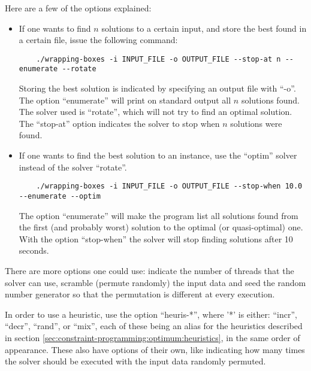 Here are a few of the options explained:
\begin{itemize}
	\item If one wants to find $n$ solutions to a certain input, and store the
	best found in a certain file, issue the following command:
	\begin{verbatim}
	./wrapping-boxes -i INPUT_FILE -o OUTPUT_FILE --stop-at n --enumerate --rotate
	\end{verbatim}
	
	Storing the best solution is indicated by specifying an output file with ``-o''.
	The option ``enumerate'' will print on standard output all $n$ solutions found.
	The solver used is ``rotate'', which will not try to find an optimal solution.
	The ``stop-at'' option indicates the solver to stop when $n$ solutions were
	found.
	
	\item If one wants to find the best solution to an instance, use the ``optim'' solver
	instead of the solver ``rotate''.
	\begin{verbatim}
	./wrapping-boxes -i INPUT_FILE -o OUTPUT_FILE --stop-when 10.0 --enumerate --optim
	\end{verbatim}
	
	The option ``enumerate'' will make the program list all solutions found from
	the first (and probably worst) solution to the optimal (or quasi-optimal) one.
	With the option ``stop-when'' the solver will stop finding solutions after 10 seconds.
\end{itemize}

There are more options one could use: indicate the number of threads that the solver
can use, scramble (permute randomly) the input data and seed the random number generator
so that the permutation is different at every execution.

\hfill

In order to use a heuristic, use the option ``heuris-*'', where '*' is either: ``incr'',
``decr'', ``rand'', or ``mix'', each of these being an alias for the heuristics
described in section \ref{sec:constraint-programming:optimum:heuristics}, in the same
order of appearance. These also have options of their own, like indicating how many
times the solver should be executed with the input data randomly permuted.

